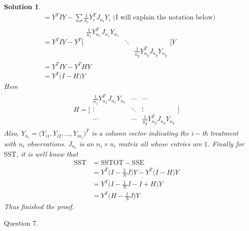 \documentclass[11pt]{article}
\newtheorem{sol}{Solution}
\begin{document}
\begin{sol}
\begin{align*}
		                &= Y^T I Y - \sum \frac{1}{n_i}Y_i^T J_{n_i} Y_i \text{ (I will explain the notation below)}\\
		                &= Y^T I Y - Y^T \Big[\begin{array}{ccc} \frac{1}{n_1}Y_{n_1}^T J_{n_1}Y_{n_1}& &  \\   & \ddots &  \\  & &\frac{1}{n_g}Y_{n_g}^TJ_{n_g}Y_{n_g} \end{array}\Big] Y\\
		                &= Y^T I Y - Y^T H Y\\
		                & = Y^T\Big(I - H\Big)Y
	\end{align*}
	Here
	\begin{align*}
		H = \Big[\begin{array}{ccc} \frac{1}{n_1}Y_{n_1}^T J_{n_1}Y_{n_1}&\cdots& \cdots\\  \vdots & \ddots & \vdots \\ \cdots &\cdots&\frac{1}{n_g}Y_{n_g}^TJ_{n_g}Y_{n_g} \end{array}\Big]
	\end{align*}
	Also, $Y_{n_i} = \Big(Y_{i1}, Y_{i2}, \ldots, Y_{in_i}\Big)^T$ is a column vector indicating the $i-$th treatment with $n_i$ observations. $J_{n_i}$ is an $n_i \times n_i$ matrix all whose entries are $1$.\vskip 2mm
	Finally for $\text{SST}$, it is well know that
	\begin{align*}
		\text{SST} &= \text{SSTOT} - \text{SSE}\\
		&= Y^T\Big(I -\frac{1}{N}J\Big)Y - Y^T\Big(I - H\Big)Y\\
		&= Y^T\Big(I - \frac{1}{N}J - I + H\Big)Y\\
		&= Y^T\Big(H - \frac{1}{N}J\Big)Y
	\end{align*}
	Thus finished the proof.
\end{sol}
Question $7$.
\end{document}
